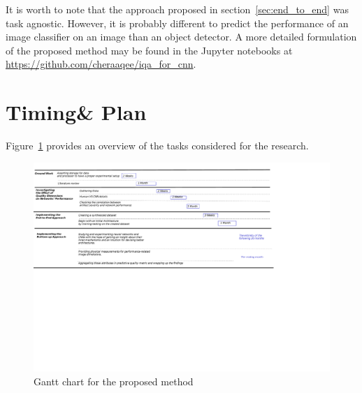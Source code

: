 \documentclass{article}
\begin{document}
It is worth to note that the approach proposed in section~\ref{sec:end_to_end} was task agnostic. However, it is probably different to predict the performance of an image classifier on an image than an object detector. A more detailed formulation of the proposed method may be found in the Jupyter notebooks at \href{https://github.com/cheraaqee/iqa\_for\_cnn}{https://github.com/cheraaqee/iqa\_for\_cnn}.

\section{Timing\& Plan} \label{sec:timing_plan}
Figure~\ref{fig:gantt} provides an overview of the tasks considered for the research.
\begin{landscape}
\begin{figure}
	\includegraphics[trim=0 14.5cm 8cm 1cm, clip, width = 26cm]{gantt}
	\caption{Gantt chart for the proposed method}
	\label{fig:gantt}
\end{figure}
\end{landscape}
\end{document}
